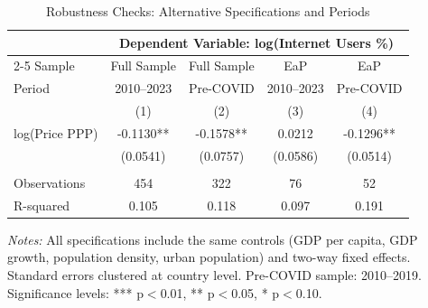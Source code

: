 \begin{table}[htbp]
\centering
\caption{Robustness Checks: Alternative Specifications and Periods}
\label{tab:robustness}
\begin{tabular}{lcccc}
\toprule
 & \multicolumn{4}{c}{\textbf{Dependent Variable: log(Internet Users \%)}} \\
\cmidrule(lr){2-5}
Sample & Full Sample & Full Sample & EaP & EaP \\
Period & 2010--2023 & Pre-COVID & 2010--2023 & Pre-COVID \\
 & (1) & (2) & (3) & (4) \\
\midrule
log(Price PPP)  & -0.1130** & -0.1578** & 0.0212 & -0.1296** \\
  & (0.0541) & (0.0757) & (0.0586) & (0.0514) \\
 & & & & \\
Observations  & 454 & 322 & 76 & 52 \\
R-squared  & 0.105 & 0.118 & 0.097 & 0.191 \\
\bottomrule
\end{tabular}
\begin{tablenotes}
\small
\item \textit{Notes:} All specifications include the same controls (GDP per capita, GDP growth, population density, urban population) and two-way fixed effects. Standard errors clustered at country level. Pre-COVID sample: 2010--2019. Significance levels: *** p$<$0.01, ** p$<$0.05, * p$<$0.10.
\end{tablenotes}
\end{table}
